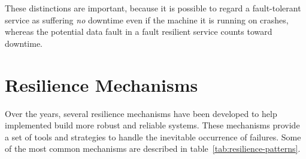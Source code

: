 These distinctions are important, because it is possible to regard a fault-tolerant service as suffering \textit{no} downtime even if the machine it is running on crashes, whereas the potential data fault in a fault resilient service counts toward downtime.


\section{Resilience Mechanisms}\label{sec:resilience-mechanisms}

Over the years, several resilience mechanisms have been developed to help implemented build more robust and reliable systems. These mechanisms provide a set of tools and strategies to handle the inevitable occurrence of failures. Some of the most common mechanisms are described in table~\ref{tab:resilience-patterns}.


